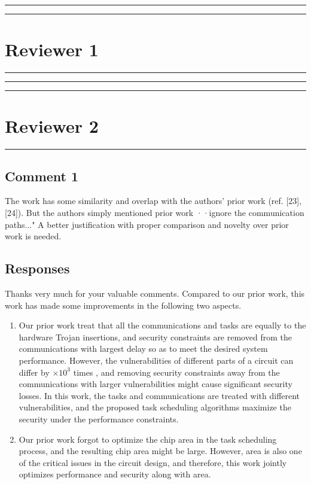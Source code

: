 \documentclass[10pt,journal, compsoc]{IEEEtran}
\begin{document}
\noindent\rule[0.25\baselineskip]{252pt}{1pt}
\noindent\rule[0.25\baselineskip]{252pt}{1pt}


\vspace*{2em}


\section*{{\Large Reviewer 1}}

\noindent\rule[0.25\baselineskip]{252pt}{1pt}


\noindent\rule[0.25\baselineskip]{252pt}{1pt}
\noindent\rule[0.25\baselineskip]{252pt}{1pt}





\vspace*{3em}



\section*{{\Large Reviewer 2}}

\noindent\rule[0.25\baselineskip]{252pt}{1pt}

\subsection*{Comment 1}
The work has some similarity and overlap with the authors' prior work (ref. [23], [24]). But the authors simply mentioned prior work ··ignore the communication paths..." A better justification with proper comparison and novelty over prior work is needed.

\subsection*{Responses}

Thanks very much for your valuable comments. Compared to our prior work, this work has made some improvements in the following two aspects.
\begin{enumerate}
    \item Our prior work treat that all the communications and tasks are equally to the hardware Trojan insertions, and security constraints are removed from the communications with largest delay so as to meet the desired system performance. However, the vulnerabilities of different parts of a circuit can differ by $\times10^3$ times \cite{conference:HS}, and removing security constraints away from the communications with larger vulnerabilities might cause significant security losses. In this work, the tasks and communications are treated with different vulnerabilities, and the proposed task scheduling algorithms maximize the security under the performance constraints.
    \item Our prior work forgot to optimize the chip area in the task scheduling process, and the resulting chip area might be large. However, area is also one of the critical issues in the circuit design, and therefore, this work jointly optimizes performance and security along with area.
\end{enumerate}
\end{document}
